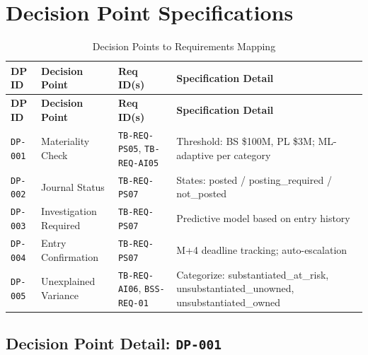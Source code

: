 \documentclass[11pt,a4paper,twoside]{report}
\newcommand{\reqref}[1]{\texttt{#1}}
\newcommand{\specref}[1]{\texttt{#1}}
\begin{document}
\section{Decision Point Specifications}
\label{sec:decision-point-specs}

\begin{longtable}{@{}C{1.5cm}L{3cm}C{3cm}L{6cm}@{}}
\caption{Decision Points to Requirements Mapping}
\label{tab:decision-points-mapping} \\
\toprule
\textbf{DP ID} & \textbf{Decision Point} & \textbf{Req ID(s)} & \textbf{Specification Detail} \\
\midrule
\endfirsthead
\toprule
\textbf{DP ID} & \textbf{Decision Point} & \textbf{Req ID(s)} & \textbf{Specification Detail} \\
\midrule
\endhead
\specref{DP-001} & Materiality Check & \reqref{TB-REQ-PS05}, \reqref{TB-REQ-AI05} & Threshold: BS \$100M, PL \$3M; ML-adaptive per category \\
\specref{DP-002} & Journal Status & \reqref{TB-REQ-PS07} & States: posted / posting\_required / not\_posted \\
\specref{DP-003} & Investigation Required & \reqref{TB-REQ-PS07} & Predictive model based on entry history \\
\specref{DP-004} & Entry Confirmation & \reqref{TB-REQ-PS07} & M+4 deadline tracking; auto-escalation \\
\specref{DP-005} & Unexplained Variance & \reqref{TB-REQ-AI06}, \reqref{BSS-REQ-01} & Categorize: substantiated\_at\_risk, unsubstantiated\_unowned, unsubstantiated\_owned \\
\bottomrule
\end{longtable}

\subsection{Decision Point Detail: \specref{DP-001}}
\end{document}
